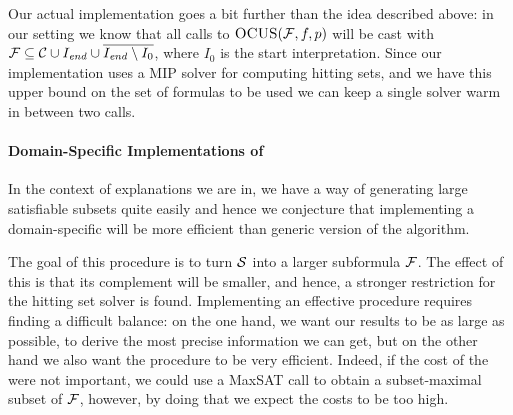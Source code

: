 Our actual implementation goes a bit further than the idea described above: in our setting we know that all calls to $\textsc{OCUS}(\mathcal{F} ,f,p)$ will be cast with $\mathcal{F}  \subseteq \mathcal{C}\cup I_\mathit{end}  \cup \overline{I_\mathit{end}  \setminus I_0}$, where $I_0$ is the start interpretation. Since our implementation uses a MIP solver for computing hitting sets, and we have this upper bound on the set of formulas to be used we can keep a single solver warm in between two \comus calls. 




\paragraph{Domain-Specific Implementations of \grow} 
In the context of explanations we are in, we have a way of generating large satisfiable subsets quite easily and hence we conjecture that implementing a domain-specific \grow will be more efficient than generic version of the \grow algorithm. 

The goal of this \grow procedure is to turn $\mathcal{S}$ into a larger subformula  $\mathcal{F} $. The effect of this is that its complement will be smaller, and hence, a stronger restriction for the hitting set solver is found.  
Implementing an effective \grow procedure requires finding a difficult balance: on the one hand, we want our results to be as large as possible, to derive the most precise information we can get, but on the other hand we also want the procedure to be very efficient. 
Indeed, if the cost of the \grow were not important, we could use a MaxSAT call to obtain a subset-maximal subset of $\mathcal{F} $, however, by doing that we expect the \grow costs to be too high. 

